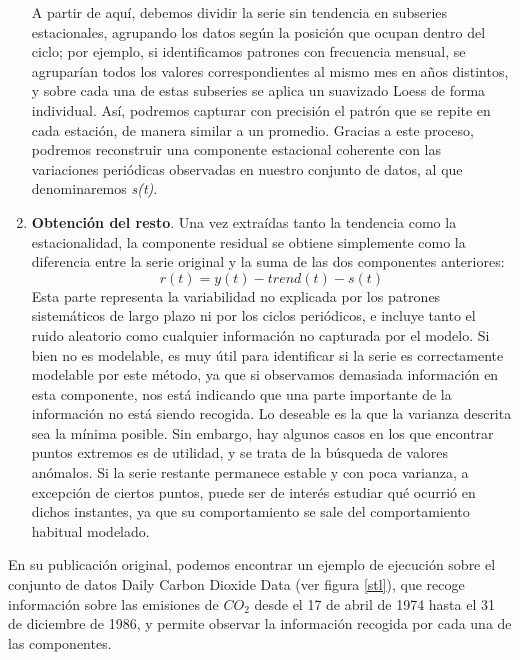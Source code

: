 \begin{enumerate}
	A partir de aquí, debemos dividir la serie sin tendencia en subseries estacionales, agrupando los datos según la posición que ocupan dentro del ciclo; por ejemplo, si identificamos patrones con frecuencia mensual, se agruparían todos los valores correspondientes al mismo mes en años distintos, y sobre cada una de estas subseries se aplica un suavizado Loess de forma individual. Así, podremos capturar con precisión el patrón que se repite en cada estación, de manera similar a un promedio. Gracias a este proceso, podremos reconstruir una componente estacional coherente con las variaciones periódicas observadas en nuestro conjunto de datos, al que denominaremos \textit{s(t)}.
	
	\item \textbf{Obtención del resto}. Una vez extraídas tanto la tendencia como la estacionalidad, la componente residual se obtiene simplemente como la diferencia entre la serie original y la suma de las dos componentes anteriores:
	$$r(t) = y(t) - trend(t) - s(t)$$
	 Esta parte representa la variabilidad no explicada por los patrones sistemáticos de largo plazo ni por los ciclos periódicos, e incluye tanto el ruido aleatorio como cualquier información no capturada por el modelo. Si bien no es modelable, es muy útil para identificar si la serie es correctamente modelable por este método, ya que si observamos demasiada información en esta componente, nos está indicando que una parte importante de la información no está siendo recogida. Lo deseable es la que la varianza descrita sea la mínima posible. Sin embargo, hay algunos casos en los que encontrar puntos extremos es de utilidad, y se trata de la búsqueda de valores anómalos. Si la serie restante permanece estable y con poca varianza, a excepción de ciertos puntos, puede ser de interés estudiar qué ocurrió en dichos instantes, ya que su comportamiento se sale del comportamiento habitual modelado.
\end{enumerate}

En su publicación original, podemos encontrar un ejemplo de ejecución sobre el conjunto de datos Daily Carbon Dioxide Data (ver figura \ref{stl}), que recoge información sobre las emisiones de $CO_2$ desde el 17 de abril de 1974 hasta el 31 de diciembre de 1986, y permite observar la información recogida por cada una de las componentes.

